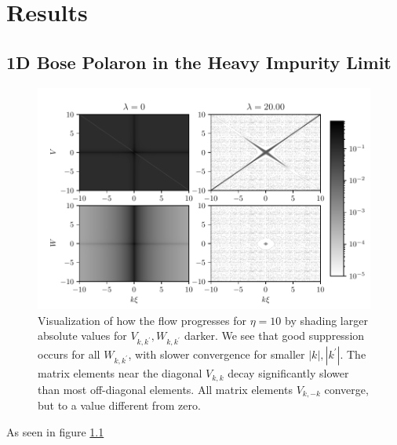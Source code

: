 \chapter{Results}\label{Results}
\section{1D Bose Polaron in the Heavy Impurity Limit}
\begin{figure}[H]
    \centering
    \includegraphics{figures/plots/PDF/FlowIllustration.pdf}
    \caption{Visualization of how the flow progresses for $\eta=10$ by shading larger absolute values for $V_{k,k^\prime},W_{k,k^\prime}$ darker. We see that good suppression occurs for all $W_{k,k^\prime}$, with slower convergence for smaller $|k|,|k^\prime|$.  The matrix elements near the diagonal $V_{k,k}$ decay significantly slower than most off-diagonal elements. All matrix elements $V_{k,-k}$ converge, but to a value different from zero.}
    \label{FlowIllustration}
\end{figure}
As seen in figure \ref{FlowIllustration}